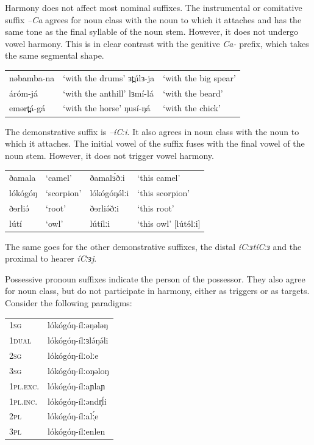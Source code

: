 Harmony does not affect most nominal suffixes. The instrumental or comitative suffix \textit{–Ca} agrees for noun class with the noun to which it attaches and has the same tone as the final syllable of the noun stem. However, it does not undergo vowel harmony. This is in clear contrast with the genitive \textit{Ca-} prefix, which takes the same segmental shape.

\ea
\begin{tabular}[t]{lll}
	nəbamba-na	&	‘with the drums’	ɜt̪úlɜ-ja	&	‘with the big spear’\\
	áróm-já		&	‘with the anthill’	lɜmí-lá	&	‘with the beard’\\
	emərt̪á-gá	&	‘with the horse’	ŋusí-ŋá		&	‘with the chick’\\
\end{tabular}
\z

The demonstrative suffix is \textit{–íCːi}. It also agrees in noun class with the noun to which it attaches. The initial vowel of the suffix fuses with the final vowel of the noun stem. However, it does not trigger vowel harmony. 

\ea
\begin{tabular}[t]{llll}
ðamala	&	‘camel’		&	ðamalɜ́ðːi	&	‘this camel’\\
lókógóŋ	&	‘scorpion’	&	lókógóŋə́lːi	&	‘this scorpion’\\
ðɘrliə́	&	‘root’		&	ðɘrliə́ðːi	&	‘this root’\\
lútí	&	‘owl’		&	lútílːi		&	‘this owl’	[lútɘ́lːi]\\
\end{tabular}
\z

The same goes for the other demonstrative suffixes, the distal \textit{íCːɜtíCːɜ} and the proximal to hearer \textit{íCːɜj}. 

Possessive pronoun suffixes indicate the person of the possessor. They also agree for noun class, but do not participate in harmony, either as triggers or as targets. Consider the following paradigms:

\ea
\begin{tabular}[t]{ll}
	1\textsc{sg}		&	lókógóŋ-ílːəŋələŋ \\
	1\textsc{dual}	&	lókógóŋ-ílːɜlə́ŋə́li  \\
	2\textsc{sg}		&	lókógóŋ-ílːolːe \\
	3\textsc{sg}		&	lókógóŋ-ílːoŋəloŋ\\
	1\textsc{pl.exc}.&	lókógóŋ-ílːaɲlaɲ  \\
	1\textsc{pl.inc}.&	lókógóŋ-ílːəndr̩ĺi \\ 
	2\textsc{pl}		&	lókógóŋ-ílːalː̩́e \\
	3\textsc{pl}		&	lókógóŋ-ílːenlen\\
\end{tabular}
\z

